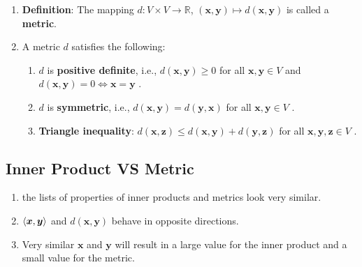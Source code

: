 \begin{enumerate}
    \item \textbf{Definition}: The mapping $d : V \times V \to \mathbb{R}$, $(\bm{x}, \bm{y}) \mapsto d(\bm{x}, \bm{y})$ is called a \textbf{metric}.
    \hfill \cite{mfml/book/mml/Deisenroth-Faisal-Ong}

    \item A metric $d$ satisfies the following:
    \hfill \cite{mfml/book/mml/Deisenroth-Faisal-Ong}
    \begin{enumerate}
        \item $d$ is \textbf{positive definite}, i.e., $d(\bm{x}, \bm{y}) \geq 0$ for all $\bm{x}, \bm{y} \in V$ and $d(\bm{x}, \bm{y}) = 0 \Longleftrightarrow \bm{x} = \bm{y}$ .
        \hfill \cite{mfml/book/mml/Deisenroth-Faisal-Ong}

        \item $d$ is \textbf{symmetric}, i.e., $d(\bm{x}, \bm{y}) = d(\bm{y}, \bm{x})$ for all $\bm{x}, \bm{y} \in V$ .
        \hfill \cite{mfml/book/mml/Deisenroth-Faisal-Ong}

        \item \textbf{Triangle inequality}: $d(\bm{x}, \bm{z}) \leq d(\bm{x}, \bm{y}) + d(\bm{y}, \bm{z})$ for all $\bm{x}, \bm{y}, \bm{z} \in V$ .
        \hfill \cite{mfml/book/mml/Deisenroth-Faisal-Ong}
    \end{enumerate}
\end{enumerate}



\subsection{Inner Product VS Metric}

\begin{enumerate}
    \item the lists of properties of inner products and metrics look very similar. 
    \hfill \cite{mfml/book/mml/Deisenroth-Faisal-Ong}

    \item $\langle\bm{x}, \bm{y}\rangle$ and $d(\bm{x}, \bm{y})$ behave in opposite directions.
    \hfill \cite{mfml/book/mml/Deisenroth-Faisal-Ong}

    \item Very similar $\bm{x}$ and $\bm{y}$ will result in a large value for the inner product and a small value for the metric.
    \hfill \cite{mfml/book/mml/Deisenroth-Faisal-Ong}
\end{enumerate}




